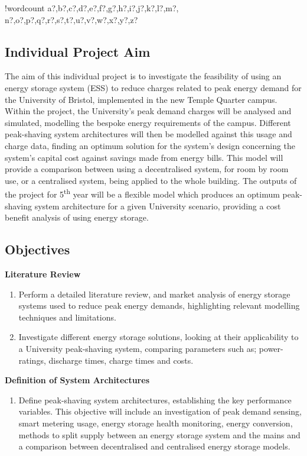 \documentclass[fontsize=9.5pt]{extarticle}
\numberwithin{figure}{section} %
\newcounter{words}
\newenvironment{counted}{%
  \setcounter{words}{0}
  \SearchList!{wordcount}{\stepcounter{words}}
    {a?,b?,c?,d?,e?,f?,g?,h?,i?,j?,k?,l?,m?,
    n?,o?,p?,q?,r?,s?,t?,u?,v?,w?,x?,y?,z?}
  \UndoBoundary{'}
  \SearchOrder{p;}}{%
  \StopSearching}
\begin{document}
\begin{counted}
\subsection{Individual Project Aim}\label{individual-project-aim}

The aim of this individual project is to investigate the feasibility of
using an energy storage system (ESS) to reduce charges related to peak
energy demand for the University of Bristol, implemented in the new
Temple Quarter campus. Within the project, the University's peak demand
charges will be analysed and simulated, modelling the bespoke energy
requirements of the campus. Different peak-shaving system architectures
will then be modelled against this usage and charge data, finding an
optimum solution for the system's design concerning the system's capital
cost against savings made from energy bills. This model will provide a
comparison between using a decentralised system, for room by room use,
or a centralised system, being applied to the whole building. The
outputs of the project for 5\textsuperscript{th} year will be a flexible
model which produces an optimum peak-shaving system architecture for a
given University scenario, providing a cost benefit analysis of using
energy storage.

\subsection{Objectives}\label{objectives}

\textbf{Literature Review}

\begin{enumerate}
\item Perform a detailed literature review, and market analysis of energy storage systems used to reduce peak energy demands, highlighting relevant modelling techniques and limitations.
\item Investigate different energy storage solutions, looking at their applicability to a University peak-shaving system, comparing parameters such as; power-ratings, discharge times, charge times and costs.
\end{enumerate}

\textbf{Definition of System Architectures}

\begin{enumerate}[resume]
\item Define peak-shaving system architectures, establishing the key performance variables. This objective will include an investigation of peak demand sensing, smart metering usage, energy storage health monitoring, energy conversion, methods to split supply between an energy storage system and the mains and a comparison between decentralised and centralised energy storage models.


\end{enumerate}
\end{counted}
\end{document}
